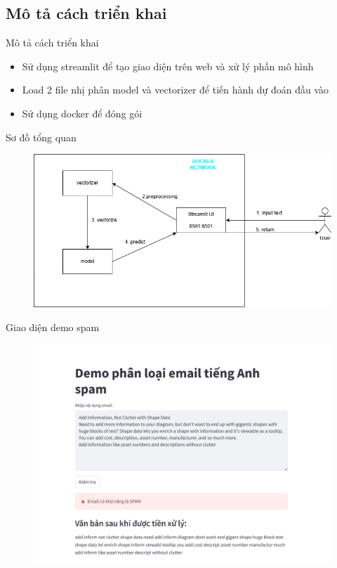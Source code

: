 \documentclass[serif, aspectratio=169]{beamer}
\begin{document}
	\subsection{Mô tả cách triển khai}
	\begin{frame}{Mô tả cách triển khai}
		\begin{itemize}
			\item Sử dụng streamlit để tạo giao diện trên web và xử lý phần mô hình
			\item Load 2 file nhị phân model và vectorizer để tiến hành dự đoán đầu vào
			\item Sử dụng docker để đóng gói
		\end{itemize}
		
	\end{frame}
	\begin{frame}{Sơ đồ tổng quan}
		\begin{figure}
			\centering
			\includegraphics[width=0.8\linewidth]{pic/demo-ai-sys.png}
			\label{fig:demo-ai-sys}
		\end{figure}
	\end{frame}
	\begin{frame}{Giao diện demo spam}
		\begin{figure}
			\centering
			\includegraphics[width=0.6\linewidth]{pic/demo-spam.png}
			\label{fig:demo-spam}
		\end{figure}
	\end{frame}
\end{document}
